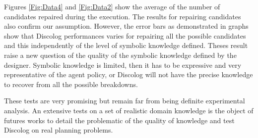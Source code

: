 \documentclass[conference]{IEEEtran}
\begin{document}
	\par  Figures \ref{Fig:Data4} and \ref{Fig:Data2} show the average of the number of candidates repaired during the execution. The results for repairing  candidates also confirm our assumption. However, the error bars as demonstrated in graphs show that Discolog performances varies for repairing all the possible candidates and this independently of the level of symbolic knowledge defined. Theses result raise a new question of the quality of the symbolic knowledge defined by the designer. Symbolic knowledge is limited, then it has to be expressive and very representative of the agent policy, or Discolog will not have the precise knowledge to recover from all the possible breakdowns. 
	\par These tests are very promising but remain far from being definite experimental analysis. An extensive tests on a set of realistic domain knowledge is the object of futures works to detail the problematic of the quality of knowledge and test Discolog on real planning problems. 
\end{document}

